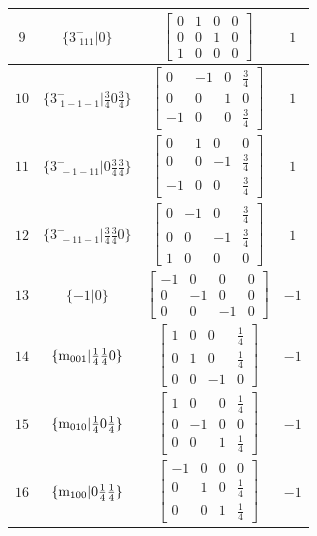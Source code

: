 \documentclass[fleqn,8pt]{jsarticle}
\begin{document}
\begin{longtable}{cccc}
$ 9 $ & $ \{3^{-}_{\,\,111}|0\} $ & $ \begin{bmatrix} 0 & 1 & 0 & 0 \\ 0 & 0 & 1 & 0 \\ 1 & 0 & 0 & 0 \end{bmatrix} $ & $ 1 $ \\ \hline
$ 10 $ & $ \{3^{-}_{\,\,1-1-1}|\frac{3}{4} 0 \frac{3}{4}\} $ & $ \begin{bmatrix} 0 & -1 & 0 & \frac{3}{4} \\ 0 & 0 & 1 & 0 \\ -1 & 0 & 0 & \frac{3}{4} \end{bmatrix} $ & $ 1 $ \\ \hline
$ 11 $ & $ \{3^{-}_{\,\,-1-11}|0 \frac{3}{4} \frac{3}{4}\} $ & $ \begin{bmatrix} 0 & 1 & 0 & 0 \\ 0 & 0 & -1 & \frac{3}{4} \\ -1 & 0 & 0 & \frac{3}{4} \end{bmatrix} $ & $ 1 $ \\ \hline
$ 12 $ & $ \{3^{-}_{\,\,-11-1}|\frac{3}{4} \frac{3}{4} 0\} $ & $ \begin{bmatrix} 0 & -1 & 0 & \frac{3}{4} \\ 0 & 0 & -1 & \frac{3}{4} \\ 1 & 0 & 0 & 0 \end{bmatrix} $ & $ 1 $ \\ \hline
$ 13 $ & $ \{-1|0\} $ & $ \begin{bmatrix} -1 & 0 & 0 & 0 \\ 0 & -1 & 0 & 0 \\ 0 & 0 & -1 & 0 \end{bmatrix} $ & $ -1 $ \\ \hline
$ 14 $ & $ \{{\rm m}_{001}|\frac{1}{4} \frac{1}{4} 0\} $ & $ \begin{bmatrix} 1 & 0 & 0 & \frac{1}{4} \\ 0 & 1 & 0 & \frac{1}{4} \\ 0 & 0 & -1 & 0 \end{bmatrix} $ & $ -1 $ \\ \hline
$ 15 $ & $ \{{\rm m}_{010}|\frac{1}{4} 0 \frac{1}{4}\} $ & $ \begin{bmatrix} 1 & 0 & 0 & \frac{1}{4} \\ 0 & -1 & 0 & 0 \\ 0 & 0 & 1 & \frac{1}{4} \end{bmatrix} $ & $ -1 $ \\ \hline
$ 16 $ & $ \{{\rm m}_{100}|0 \frac{1}{4} \frac{1}{4}\} $ & $ \begin{bmatrix} -1 & 0 & 0 & 0 \\ 0 & 1 & 0 & \frac{1}{4} \\ 0 & 0 & 1 & \frac{1}{4} \end{bmatrix} $ & $ -1 $ \\ \hline

\end{longtable}
\end{document}
